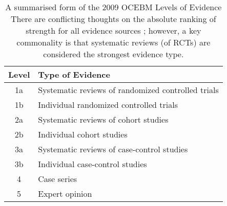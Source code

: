 \begin{table}[ht]
\centering
\small
\begin{adjustbox}{width=\columnwidth/2}
\begin{tabular}{|c|l|}
\hline
\textbf{Level} & \textbf{Type of Evidence} \\
\hline
1a & Systematic reviews of randomized controlled trials \\
1b & Individual randomized controlled trials \\
2a & Systematic reviews of cohort studies \\
2b & Individual cohort studies \\
3a & Systematic reviews of case-control studies \\
3b & Individual case-control studies \\
4 & Case series \\
5 & Expert opinion \\
\hline
\end{tabular}
\end{adjustbox}
\caption[A summarised form of the 2009 OCEBM Levels of Evidence]{A summarised form of the 2009 OCEBM Levels of Evidence \cite{noauthor_oxford_nodate} There are conflicting thoughts on the absolute ranking of strength for all evidence sources \cite{swanson_how_2010, guyatt_grade_2008}; however, a key commonality is that systematic reviews (of RCTs) are considered the strongest evidence type.}
\label{tab:evidence_levels}
\end{table}